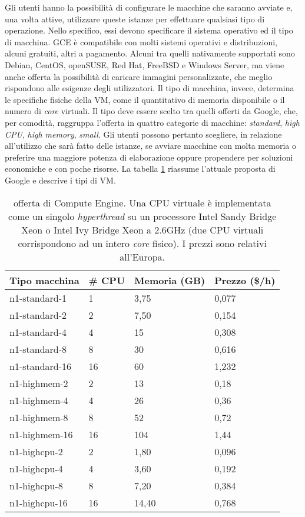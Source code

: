 Gli utenti hanno la possibilità di configurare le macchine che saranno avviate e, una volta attive, utilizzare queste istanze per effettuare qualsiasi tipo di operazione. 
Nello specifico, essi devono specificare il sistema operativo ed il tipo di macchina. GCE è compatibile con molti sistemi operativi e distribuzioni, alcuni gratuiti, altri 
a pagamento. Alcuni tra quelli nativamente supportati sono Debian, CentOS, openSUSE, Red Hat, FreeBSD e Windows Server, ma viene anche offerta la possibilità di caricare 
immagini personalizzate, che meglio rispondono alle esigenze degli utilizzatori. Il tipo di macchina, invece, determina le specifiche fisiche della VM, come il quantitativo 
di memoria disponibile o il numero di \textit{core} virtuali. Il tipo deve essere scelto tra quelli offerti da Google, che, per comodità, raggruppa l’offerta in quattro categorie di
macchine: \textit{standard}, \textit{high CPU}, \textit{high memory}, \textit{small}. Gli utenti possono pertanto scegliere, in relazione all’utilizzo che sarà fatto delle istanze, se avviare macchine con molta 
memoria o preferire una maggiore potenza di elaborazione oppure propendere per soluzioni economiche e con poche risorse. La tabella \ref{table:GCE} riassume l’attuale proposta di Google 
e descrive i tipi di VM.

\begin{table}[ht]
\centering
\begin{tabular}{|l|l|l|l|}
\hline
Tipo macchina  & # CPU & Memoria (GB) & Prezzo (\$/h) \\ \hline
n1-standard-1  & 1        & 3,75         & 0,077       \\
n1-standard-2  & 2        & 7,50         & 0,154       \\
n1-standard-4  & 4        & 15           & 0,308       \\
n1-standard-8  & 8        & 30           & 0,616       \\
n1-standard-16 & 16       & 60           & 1,232       \\
n1-highmem-2   & 2        & 13           & 0,18        \\
n1-highmem-4   & 4        & 26           & 0,36        \\
n1-highmem-8   & 8        & 52           & 0,72        \\
n1-highmem-16  & 16       & 104          & 1,44        \\
n1-highcpu-2   & 2        & 1,80         & 0,096       \\
n1-highcpu-4   & 4        & 3,60         & 0,192       \\
n1-highcpu-8   & 8        & 7,20         & 0,384       \\
n1-highcpu-16  & 16       & 14,40        & 0,768       \\ \hline
\end{tabular}
\caption{offerta di Compute Engine. Una CPU virtuale è implementata come un singolo \textit{hyperthread} su un processore Intel Sandy Bridge Xeon o Intel Ivy Bridge Xeon a 2.6GHz 
(due CPU virtuali corrispondono ad un intero \textit{core} fisico). I prezzi sono relativi all'Europa.}
\label{table:GCE}
\end{table}

